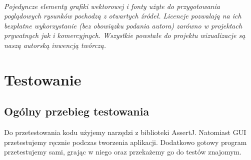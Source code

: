 \documentclass[a4paper]{article}
\begin{document}
\paragraph{}\textit{Pojedyncze elementy grafiki wektorowej i fonty użyte do przygotowania poglądowych rysunków pochodzą z otwartych źródeł. Licencje pozwalają na ich bezpłatne wykorzystanie (bez obowiązku podania autora) zarówno w projektach prywatnych jak i komercyjnych. Wszystkie powstałe do projektu wizualizacje są naszą autorską inwencją twórczą.}

\section{Testowanie}
\subsection{Ogólny przebieg testowania}
Do przetestowania kodu użyjemy narzędzi z biblioteki AssertJ. Natomiast GUI przetestujemy ręcznie podczas tworzenia aplikacji. Dodatkowo gotowy program przetestujemy sami, grając w niego oraz przekażemy go do testów znajomym.
\label{end}
\end{document}
